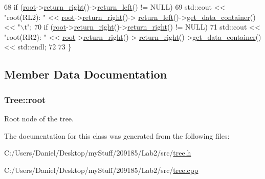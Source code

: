 \begin{DoxyCode}
68     \textcolor{keywordflow}{if} (\hyperlink{class_tree_adea11d0e123823b769f7c3ee9a5a1088}{root}->\hyperlink{class_node_a2789b35639dd329c7f406a5908ec386a}{return\_right}()->\hyperlink{class_node_a82da98f383fdd0649c037b454432487d}{return\_left}() != NULL)
69         std::cout << \textcolor{stringliteral}{"root(RL2): "} << \hyperlink{class_tree_adea11d0e123823b769f7c3ee9a5a1088}{root}->\hyperlink{class_node_a2789b35639dd329c7f406a5908ec386a}{return\_right}()->
      \hyperlink{class_node_a82da98f383fdd0649c037b454432487d}{return\_left}()->\hyperlink{class_node_a76d508260acf793cffe7115d3a3a81ba}{get\_data\_container}() << \textcolor{stringliteral}{"\(\backslash\)t"};
70     \textcolor{keywordflow}{if} (\hyperlink{class_tree_adea11d0e123823b769f7c3ee9a5a1088}{root}->\hyperlink{class_node_a2789b35639dd329c7f406a5908ec386a}{return\_right}()->\hyperlink{class_node_a2789b35639dd329c7f406a5908ec386a}{return\_right}() != NULL)
71         std::cout << \textcolor{stringliteral}{"root(RR2): "} << \hyperlink{class_tree_adea11d0e123823b769f7c3ee9a5a1088}{root}->\hyperlink{class_node_a2789b35639dd329c7f406a5908ec386a}{return\_right}()->
      \hyperlink{class_node_a2789b35639dd329c7f406a5908ec386a}{return\_right}()->\hyperlink{class_node_a76d508260acf793cffe7115d3a3a81ba}{get\_data\_container}() << std::endl;
72 
73 \}\end{DoxyCode}


\subsection{Member Data Documentation}
\hypertarget{class_tree_adea11d0e123823b769f7c3ee9a5a1088}{}
\subsubsection[{root}]{\setlength{\rightskip}{0pt plus 5cm}Tree\+::root\hspace{0.3cm}{\ttfamily [private]}}\label{class_tree_adea11d0e123823b769f7c3ee9a5a1088}


Root node of the tree. 



The documentation for this class was generated from the following files\+:\begin{DoxyCompactItemize}
\item 
C\+:/\+Users/\+Daniel/\+Desktop/my\+Stuff/209185/\+Lab2/src/\hyperlink{tree_8h}{tree.\+h}\item 
C\+:/\+Users/\+Daniel/\+Desktop/my\+Stuff/209185/\+Lab2/src/\hyperlink{tree_8cpp}{tree.\+cpp}\end{DoxyCompactItemize}
